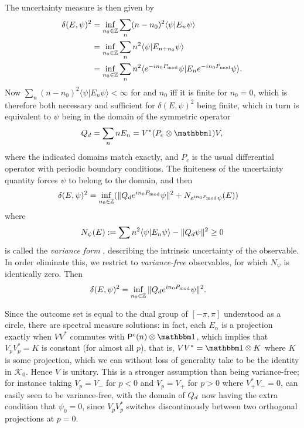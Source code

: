 The uncertainty measure is then given by
\begin{align*}
\delta(E,\psi)^2 &= \inf_{n_0\in \mathbb Z} \sum_n (n-n_0)^2 \langle \psi|E_n\psi\rangle \\
&= \inf_{n_0\in \mathbb Z} \sum_n n^2 \langle \psi|E_{n+n_0}\psi\rangle\\
& = \inf_{n_0\in \mathbb Z} \sum_n n^2 \langle e^{-in_0P_{\mathrm{mod}}}\psi|E_{n}e^{-in_0P_{\mathrm{mod}}}\psi\rangle.
\end{align*}
Now $\sum_n (n-n_0)^2 \langle \psi|E_n\psi\rangle<\infty$ for and $n_0$ iff it is finite for $n_0=0$, which is therefore both necessary and sufficient for $\delta(E,\psi)^2$ being finite, which in turn is equivalent to $\psi$ being in the domain of the symmetric operator
$$
\Qd = \sum_n n E_n = V^* (P_c\otimes \id) V,
$$
where the indicated domains match exactly, and $P_c$ is the usual differential operator with periodic boundary conditions. The finiteness of the uncertainty quantity forces $\psi$ to belong to the domain, and then
\begin{align*}
\delta(E,\psi)^2 &= \inf_{n_0\in \mathbb Z}(\|Q_d e^{in_0P_{\mathrm{mod}}}\psi\|^2 + N_{e^{in_0P_{\mathrm{mod}}}\psi}(E))
\end{align*}
where $$N_\psi(E) := \sum n^2 \langle \psi |E_n\psi\rangle - \|Q_d\psi\|^2\geq 0$$ is called the \emph{variance form} \cites{werner-screen-obs}{akhiezer-glazman-lin-ops-hilb-space}{WOJCIK2015531}, describing the intrinsic uncertainty of the observable. In order eliminate this, we restrict to \emph{variance-free} observables, for which $N_\psi$ is identically zero. Then 
\begin{align*}
\delta(E,\psi)^2 &= \inf_{n_0\in \mathbb Z} \|Q_d e^{in_0P_{\mathrm{mod}}}\psi\|^2.
\end{align*}

Since the outcome set is equal to the dual group of $[-\pi,\pi]$ understood as a circle, there are spectral measure solutions: in fact, each $E_n$ is a projection exactly when $VV^*$ commutes with $\Pc(n)\otimes \id$, which implies that $V_pV_p^* = K$ is constant (for almost all $p$), that is, $VV^* =\id \otimes K$ where $K$ is some projection, which we can without loss of generality take to be the identity in $\mathcal K_0$. Hence $V$ is unitary. This is a stronger assumption than being variance-free; for instance taking $V_p=V_-$ for $p<0$ and $V_p=V_+$ for $p>0$ where $V_+^*V_-=0$, can easily seen to be variance-free, with the domain of $Q_d$ now having the extra condition that $\psi_0=0$, since $V_pV_p^*$ switches discontinously between two orthogonal projections at $p=0$.

